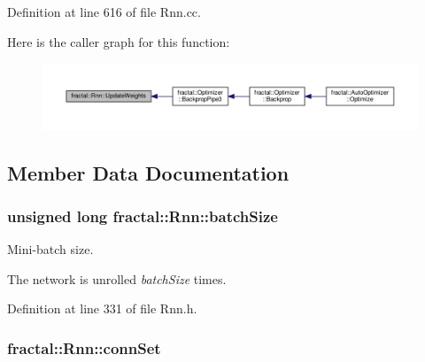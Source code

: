 Definition at line 616 of file Rnn.\+cc.



Here is the caller graph for this function\+:\nopagebreak
\begin{figure}[H]
\begin{center}
\leavevmode
\includegraphics[width=350pt]{de/dca/classfractal_1_1Rnn_ac1431fc224150e1e7753b1a3ad2c7fac_icgraph}
\end{center}
\end{figure}




\subsection{Member Data Documentation}
\hypertarget{classfractal_1_1Rnn_a18afcf7887c5a86d4f6cccae67646ed0}{
\subsubsection[{batch\+Size}]{\setlength{\rightskip}{0pt plus 5cm}unsigned long fractal\+::\+Rnn\+::batch\+Size\hspace{0.3cm}{\ttfamily [protected]}}}\label{classfractal_1_1Rnn_a18afcf7887c5a86d4f6cccae67646ed0}


Mini-\/batch size. 

The network is unrolled {\itshape batch\+Size} times. 

Definition at line 331 of file Rnn.\+h.

\hypertarget{classfractal_1_1Rnn_adc46382430319f0ef64ee9119f370cad}{
\subsubsection[{conn\+Set}]{ fractal\+::\+Rnn\+::conn\+Set\hspace{0.3cm}{\ttfamily [protected]}}}\label{classfractal_1_1Rnn_adc46382430319f0ef64ee9119f370cad}



